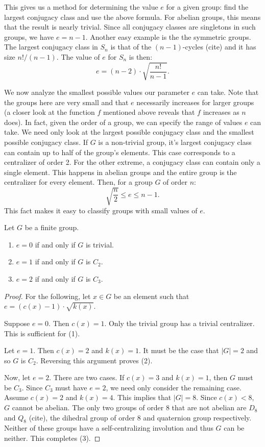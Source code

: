 \documentclass[main.tex]{subfiles}
\begin{document}
This gives us a method for determining the value $e$ for a given group: find the largest conjugacy class and use the above formula. For abelian groups, this means that the result is nearly trivial. Since all conjugacy classes are singletons in such groups, we have $e = n - 1$. Another easy example is the the symmetric groups. The largest conjugacy class in $S_n$ is that of the $(n-1)$-cycles (cite) and it has size $n!/(n-1)$. The value of $e$ for $S_n$ is then:
$$e = (n - 2) \cdot \sqrt{\frac{n!}{n-1}}\text{.}$$

\hss

We now analyze the smallest possible values our parameter $e$ can take. Note that the groups here are very small and that $e$ necessarily increases for larger groups (a closer look at the function $f$ mentioned above reveals that $f$ increases as $n$ does). In fact, given the order of a group, we can specify the range of values $e$ can take. We need only look at the largest possible conjugacy class and the smallest possible conjugacy class. If $G$ is a non-trivial group, it's largest conjugacy class can contain up to half of the group's elements. This case corresponds to a centralizer of order 2. For the other extreme, a conjugacy class can contain only a single element. This happens in abelian groups and the entire group is the centralizer for every element. Then, for a group $G$ of order $n$:
\begin{equation}\label{erange}
\sqrt{\frac{n}{2}} \le e \le n - 1\text{.}
\end{equation}
This fact makes it easy to classify groups with small values of $e$.

\begin{theorem}\label{easycharacterization}
Let $G$ be a finite group.
\begin{enumerate}
	\item $e = 0$ if and only if $G$ is trivial.
	\item $e = 1$ if and only if $G$ is $C_2$.
	\item $e = 2$ if and only if $G$ is $C_3$.
\end{enumerate}
\end{theorem}

\begin{proof}
For the following, let $x \in G$ be an element such that $e = (c(x) - 1) \cdot \sqrt{k(x)}$.

Suppose $e = 0$. Then $c(x) = 1$. Only the trivial group has a trivial centralizer. This is sufficient for (1).

Let $e = 1$. Then $c(x) = 2$ and $k(x) = 1$. It must be the case that $|G| = 2$ and so $G$ is $C_2$. Reversing this argument proves (2).

Now, let $e = 2$. There are two cases. If $c(x) = 3$ and $k(x) = 1$, then $G$ must be $C_3$. Since $C_3$ must have $e = 2$, we need only consider the remaining case. Assume $c(x) = 2$ and $k(x) = 4$. This implies that $|G| = 8$. Since $c(x) < 8$, $G$ cannot be abelian. The only two groups of order 8 that are not abelian are $D_8$ and $Q_8$ (cite), the dihedral group of order 8 and quaternion group respectively. Neither of these groups have a self-centralizing involution and thus $G$ can be neither. This completes (3).
\end{proof}
\end{document}
